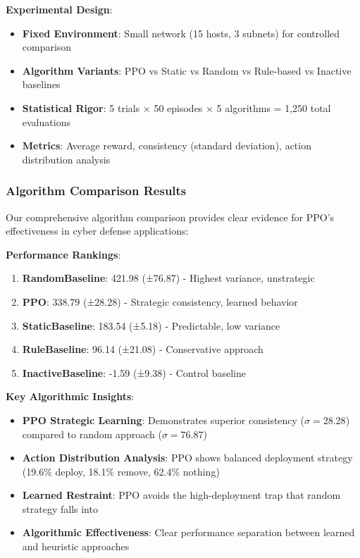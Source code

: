 \documentclass[12pt,twoside]{article}
\theoremstyle{definition}
\theoremstyle{plain}
\begin{document}
\textbf{Experimental Design}:
\begin{itemize}
\item \textbf{Fixed Environment}: Small network (15 hosts, 3 subnets) for controlled comparison
\item \textbf{Algorithm Variants}: PPO vs Static vs Random vs Rule-based vs Inactive baselines
\item \textbf{Statistical Rigor}: 5 trials × 50 episodes × 5 algorithms = 1,250 total evaluations
\item \textbf{Metrics}: Average reward, consistency (standard deviation), action distribution analysis
\end{itemize}

\subsubsection{Algorithm Comparison Results}

Our comprehensive algorithm comparison provides clear evidence for PPO's effectiveness in cyber defense applications:

\textbf{Performance Rankings}:
\begin{enumerate}
\item \textbf{RandomBaseline}: 421.98 (±76.87) - Highest variance, unstrategic
\item \textbf{PPO}: 338.79 (±28.28) - Strategic consistency, learned behavior  
\item \textbf{StaticBaseline}: 183.54 (±5.18) - Predictable, low variance
\item \textbf{RuleBaseline}: 96.14 (±21.08) - Conservative approach
\item \textbf{InactiveBaseline}: -1.59 (±9.38) - Control baseline
\end{enumerate}

\textbf{Key Algorithmic Insights}:
\begin{itemize}
\item \textbf{PPO Strategic Learning}: Demonstrates superior consistency ($\sigma=28.28$) compared to random approach ($\sigma=76.87$)
\item \textbf{Action Distribution Analysis}: PPO shows balanced deployment strategy (19.6\% deploy, 18.1\% remove, 62.4\% nothing)
\item \textbf{Learned Restraint}: PPO avoids the high-deployment trap that random strategy falls into
\item \textbf{Algorithmic Effectiveness}: Clear performance separation between learned and heuristic approaches
\end{itemize}
\end{document}
